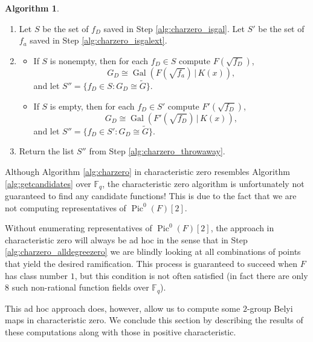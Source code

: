 \documentclass{dcthesis}
\newcommand{\wt}[1]{\widetilde{#1}}
\newcommand{\FF}{\mathbb{F}}
\DeclareMathOperator{\Pic}{Pic}
\DeclareMathOperator{\Gal}{Gal}
\numberwithin{equation}{section}
\theoremstyle{definition}
\newtheorem{alg}[equation]{Algorithm}
\theoremstyle{remark}
\begin{document}
{{{\begin{alg}
\begin{enumerate}
\begin{enumerate}
              If $F'(\sqrt{f_D})$ is Galois,
              then save $f_D$.
              Go to the next $D\in M$.
          \end{enumerate}
        \item\label{alg:charzero_overext}
          Let $S$ be the set of $f_D$
          saved in Step
          \ref{alg:charzero_isgal}.
          Let $S'$ be the set of $f_a$
          saved in Step
          \ref{alg:charzero_isgalext}.
        \item\label{alg:charzero_throwaway}
        \begin{itemize}
          \item
            If $S$ is nonempty,
            then
            for each $f_D\in S$
            compute
            $F(\sqrt{f_D})$,
            \[
              G_D\cong\Gal(F(\sqrt{f_a})\,|\,K(x)),
            \]
            and let
            $S''=
            \{f_D\in S:G_D\cong\wt{G}\}$.
          \item
            If $S$ is empty,
            then
            for each $f_D\in S'$
            compute
            $F'(\sqrt{f_D})$,
            \[
              G_D\cong\Gal(F'(\sqrt{f_D})\,|\,K(x)),
            \]
            and let
            $S''=
            \{f_D\in S':G_D\cong\wt{G}\}$.
        \end{itemize}
        \item\label{alg:charzero_return}
          Return the list $S''$ from
          Step
          \ref{alg:charzero_throwaway}.
      \end{enumerate}
    \end{alg}
    Although Algorithm
    \ref{alg:charzero}
    in characteristic zero
    resembles
    Algorithm
    \ref{alg:getcandidates} over $\FF_q$,
    the characteristic zero algorithm
    is unfortunately not guaranteed to
    find any candidate functions!
    This is due to the fact that
    we are not computing representatives
    of $\Pic^0(F)[2]$.
    \par
    Without enumerating representatives
    of $\Pic^0(F)[2]$,
    the approach in characteristic zero
    will always be ad hoc
    in the sense that in Step
    \ref{alg:charzero_alldegreezero}
    we are blindly looking at all combinations
    of points that yield the desired ramification.
    This process is guaranteed to succeed
    when $F$ has class number $1$,
    but this condition is not often satisfied
    (in fact there are only $8$ such non-rational function fields
    over $\FF_q$).
    \par
    This ad hoc approach does, however,
    allow us to compute some $2$-group
    Belyi maps in characteristic zero.
    We conclude this section by describing
    the results of these computations
    along with those in
    positive characteristic.
  }
}}
\end{document}
